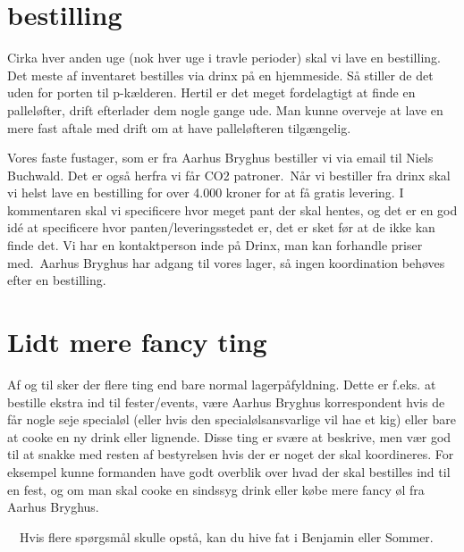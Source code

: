 \section{bestilling}

Cirka hver anden uge (nok hver uge i travle perioder) skal vi lave en bestilling. Det meste af inventaret bestilles via drinx på en hjemmeside. Så stiller de det uden for porten til p-kælderen. Hertil er det meget fordelagtigt at finde en palleløfter, drift efterlader dem nogle gange ude. Man kunne overveje at lave en mere fast aftale med drift om at have palleløfteren tilgængelig.

Vores faste fustager, som er fra Aarhus Bryghus bestiller vi via email til Niels Buchwald. Det er også herfra vi får CO2 patroner.\
Når vi bestiller fra drinx skal vi helst lave en bestilling for over 4.000 kroner for at få gratis levering. I kommentaren skal vi specificere hvor meget pant der skal hentes, og det er en god idé at specificere hvor panten/leveringsstedet er, det er sket før at de ikke kan finde det. Vi har en kontaktperson inde på Drinx, man kan forhandle priser med.\  
Aarhus Bryghus har adgang til vores lager, så ingen koordination behøves efter en bestilling. 

\section{Lidt mere fancy ting}
Af og til sker der flere ting end bare normal lagerpåfyldning. Dette er f.eks. at bestille ekstra ind til fester/events, være Aarhus Bryghus korrespondent hvis de får nogle seje specialøl (eller hvis den specialølsansvarlige vil hae et kig) eller bare at cooke en ny drink eller lignende. Disse ting er svære at beskrive, men vær god til at snakke med resten af bestyrelsen hvis der er noget der skal koordineres. For eksempel kunne formanden have godt overblik over hvad der skal bestilles ind til en fest, og om man skal cooke en sindssyg drink eller købe mere fancy øl fra Aarhus Bryghus.

\
\
Hvis flere spørgsmål skulle opstå, kan du hive fat i Benjamin eller Sommer.

